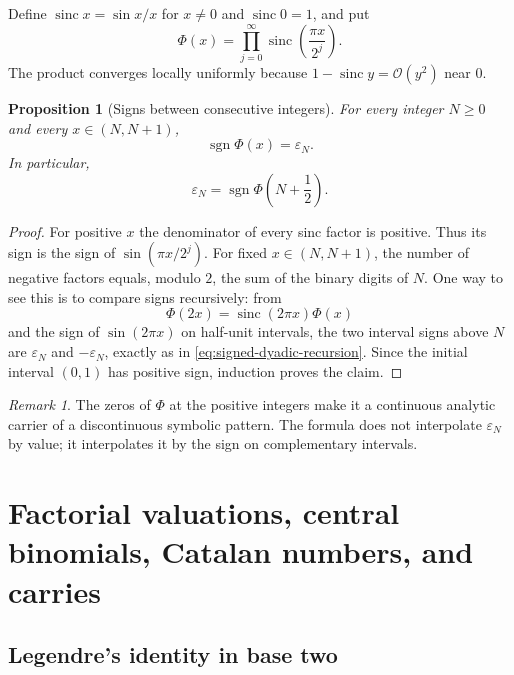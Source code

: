 \documentclass[11pt,oneside]{article}
\newtheorem{proposition}[theorem]{Proposition}
\theoremstyle{definition}
\theoremstyle{remark}
\newtheorem{remark}[theorem]{Remark}
\newcommand{\bigO}{\mathcal O}
\newcommand{\sgn}{\operatorname{sgn}}
\newcommand{\sinc}{\operatorname{sinc}}
\newcommand{\eps}{\varepsilon}
\begin{document}
Define $\sinc x=\sin x/x$ for $x\ne0$ and $\sinc 0=1$, and put
\begin{equation}\label{eq:sinc-product}
 \Phi(x)=\prod_{j=0}^{\infty}\sinc\!\left(\frac{\pi x}{2^j}\right).
\end{equation}
The product converges locally uniformly because
$1-\sinc y=\bigO(y^2)$ near $0$.

\begin{proposition}[Signs between consecutive integers]\label{prop:sinc-sign}
For every integer $N\ge0$ and every $x\in(N,N+1)$,
\begin{equation}\label{eq:sinc-sign-interval}
 \sgn\Phi(x)=\eps_N.
\end{equation}
In particular,
\begin{equation}\label{eq:sinc-half-integer}
 \eps_N=\sgn\Phi\!\left(N+\frac12\right).
\end{equation}
\end{proposition}

\begin{proof}
For positive $x$ the denominator of every sinc factor is positive.  Thus its
sign is the sign of $\sin(\pi x/2^j)$.  For fixed $x\in(N,N+1)$, the number of
negative factors equals, modulo $2$, the sum of the binary digits of $N$.
One way to see this is to compare signs recursively: from
\[
 \Phi(2x)=\sinc(2\pi x)\Phi(x)
\]
and the sign of $\sin(2\pi x)$ on half-unit intervals, the two interval signs
above $N$ are $\eps_N$ and $-\eps_N$, exactly as in
\cref{eq:signed-dyadic-recursion}.  Since the initial interval $(0,1)$ has
positive sign, induction proves the claim.
\end{proof}

\begin{remark}
The zeros of $\Phi$ at the positive integers make it a continuous analytic
carrier of a discontinuous symbolic pattern.  The formula does not interpolate
$\eps_N$ by value; it interpolates it by the sign on complementary intervals.
\end{remark}

\section{Factorial valuations, central binomials, Catalan numbers, and carries}

\subsection{Legendre's identity in base two}
\end{document}
